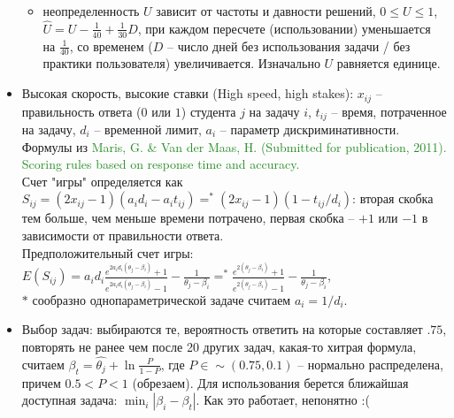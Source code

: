 \documentclass[12pt]{article}
\begin{document}
\begin{itemize}
\begin{itemize}
                \item неопределенность $U$ зависит от частоты и давности решений, $0 \le U \le 1$, $\hat{U} = U - \frac{1}{40} + \frac{1}{30} D$, при каждом пересчете (использовании) уменьшается на $\frac{1}{40}$, со временем ($D$ -- число дней без использования задачи / без практики пользователя) увеличивается. Изначально $U$ равняется единице.
            \end{itemize}
        \item Высокая скорость, высокие ставки (High speed, high stakes): $x_{ij}$ -- правильность ответа ($0$ или $1$) студента $j$ на задачу $i$, $t_{ij}$ -- время, потраченное на задачу, $d_i$ -- временной лимит, $a_i$ -- параметр дискриминативности. Формулы из \textcolor{ForestGreen}{Maris, G. & Van der Maas, H. (Submitted for publication, 2011). Scoring rules based on response time and accuracy.} \\ 
            Счет "игры" определяется как $S_{ij} = (2 x_{ij} - 1)(a_i d_i - a_i t_{ij}) =^* (2 x_{ij} - 1)(1 - t_{ij} / d_i) $: вторая скобка тем больше, чем меньше времени потрачено, первая скобка -- $+1$ или $-1$ в зависимости от правильности ответа. \\ 
            Предположительный счет игры: $E(S_{ij}) = a_i d_i \frac{e^{2 a_i d_i (\theta_j - \beta_i)} + 1}{e^{2 a_i d_i (\theta_j - \beta_i)} - 1} - \frac{1}{\theta_j - \beta_i} =^* \frac{e^{2 (\theta_j - \beta_i)} + 1}{e^{2 (\theta_j - \beta_i)} - 1} - \frac{1}{\theta_j - \beta_i}$, \\ $\ast$ сообразно однопараметрической задаче считаем $a_i = 1/d_i$.
        \item Выбор задач: выбираются те, вероятность ответить на которые составляет $.75$, повторять не ранее чем после 20 других задач, какая-то хитрая формула, считаем $\beta_t = \hat{\theta_j} + \ln{\frac{P}{1 - {P}}}$, где $P \in \sim(0.75, 0.1)$ -- нормально распределена, причем $0.5 < P < 1$ (обрезаем). Для использования берется ближайшая доступная задача: $\min_i|\beta_i - \beta_t|$. Как это работает, непонятно :(
    \end{itemize}
\end{document}
